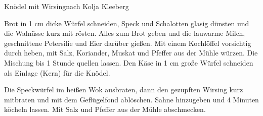 \documentclass[11pt, a4paper, toc=index, twoside, DIV12]{scrbook}
\begin{document}
\newpage
\begin{recipe}{Knödel mit Wirsing}{nach Kolja Kleeberg}


  \steps
  Brot in 1 cm dicke Würfel schneiden, Speck und Schalotten glasig dünsten und die
  Walnüsse kurz mit rösten. Alles zum Brot geben und die lauwarme Milch, geschnittene
  Petersilie und Eier darüber gießen. Mit einem Kochlöffel vorsichtig durch heben, mit
  Salz, Koriander, Muskat und Pfeffer aus der Mühle würzen.  Die Mischung \halb bis 1
  Stunde quellen lassen. Den Käse in 1 cm große Würfel schneiden als Einlage (Kern) für
  die Knödel.

  Die Speckwürfel im heißen Wok ausbraten, dann den gezupften Wirsing kurz mitbraten und
  mit dem Geflügelfond ablöschen.  Sahne hinzugeben und 4 Minuten köcheln lassen. Mit Salz
  und Pfeffer aus der Mühle abschmecken.
\end{recipe}
\end{document}
